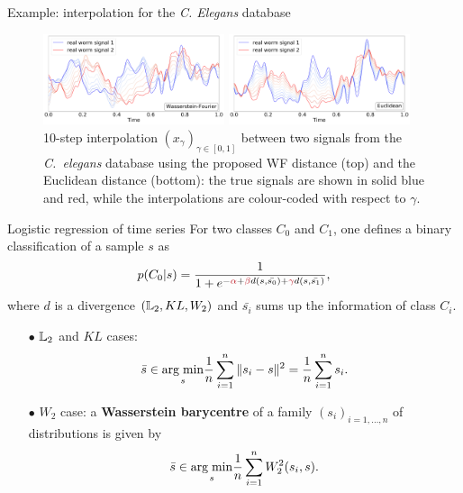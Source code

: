 \documentclass[pdf,aspectratio=169,10pt]{beamer}
\begin{document}
\begin{frame}{Example: interpolation for the \emph{C. Elegans} database}
\begin{figure}
\centering
\includegraphics[width=0.475\textwidth]{../img/worms_geodesic_sameclass.pdf}
\includegraphics[width=0.475\textwidth]{../img/worms_euclidean_sameclass.pdf}
  {10-step interpolation $(x_{\gamma})_{\gamma\in [0,1]}$ between two signals from the {\em C.~elegans} database using the proposed WF distance (top) and the Euclidean distance (bottom): the true signals are shown in solid blue and red, while the interpolations are colour-coded with respect to $\gamma$.}
\end{figure}
\end{frame}




\begin{frame}{Logistic regression of time series}
For two classes $C_0$ and $C_1$, one defines a binary classification of a sample $s$ as
$$p(C_0\vert s)=\frac{1}{1+e^{-\red{\alpha}+\red{\beta} d(s,\bar{s_0})+\red{\gamma} d(s,\bar{s_1})}},$$
where $d$ is a divergence $({\mathbb L}_2, KL, W_2)$ and $\bar{s_i}$ sums up the information of class $C_i$.

\begin{itemize}
\item[$\bullet$] ${\mathbb L}_2$ and $KL$ cases:
$$\bar{s}\in \underset{s}{\mathop{\rm arg \; min}\limits}\frac{1}{n}\sum_{i=1}^n\Vert s_i-s\Vert^2=\frac{1}{n}\sum_{i=1}^n s_i.$$
\item[$\bullet$] $W_2$ case: a \textbf{Wasserstein barycentre} of a family $(s_i)_{i=1,\ldots,n}$ of distributions is given by
$$\bar{s}\in \underset{s}{\mathop{\rm arg \; min}\limits}\frac{1}{n}\sum_{i=1}^nW_2^2(s_i,s).$$
\end{itemize}
\end{frame}
\end{document}
